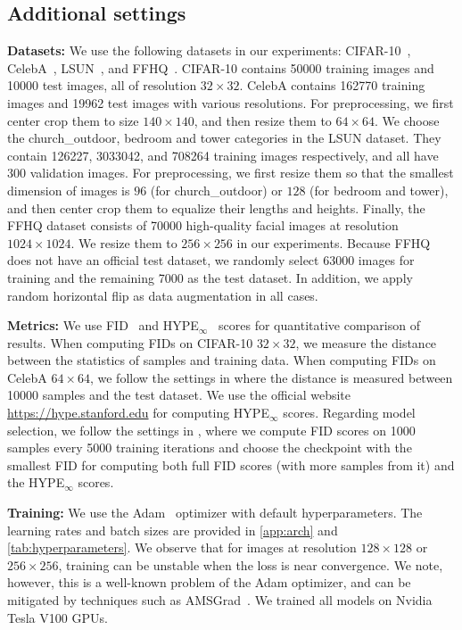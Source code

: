 \documentclass{article}
\begin{document}
\subsection{Additional settings}\label{app:settings}
\textbf{Datasets:} We use the following datasets in our experiments: CIFAR-10~\cite{krizhevsky2009learning}, CelebA~\cite{liu2015faceattributes}, LSUN~\cite{yu2015lsun}, and FFHQ~\cite{karras2019style}. CIFAR-10 contains 50000 training images and 10000 test images, all of resolution $32\times 32$. CelebA contains 162770 training images and 19962 test images with various resolutions. For preprocessing, we first center crop them to size $140\times 140$, and then resize them to $64\times 64$. We choose the church\_outdoor, bedroom and tower categories in the LSUN dataset. They contain 126227, 3033042, and 708264 training images respectively, and all have 300 validation images. For preprocessing, we first resize them so that the smallest dimension of images is $96$ (for church\_outdoor) or $128$ (for bedroom and tower), and then center crop them to equalize their lengths and heights. Finally, the FFHQ dataset consists of 70000 high-quality facial images at resolution $1024\times 1024$. We resize them to $256\times 256$ in our experiments. Because FFHQ does not have an official test dataset, we randomly select 63000 images for training and the remaining 7000 as the test dataset. In addition, we apply random horizontal flip as data augmentation in all cases.

\textbf{Metrics:} We use FID~\cite{heusel2017gans} and HYPE$_\infty$~\cite{zhou2019hype} scores for quantitative comparison of results. When computing FIDs on CIFAR-10 $32\times 32$, we measure the distance between the statistics of samples and training data. When computing FIDs on CelebA $64\times 64$, we follow the settings in \cite{song2019bridging} where the distance is measured between 10000 samples and the test dataset. We use the official website \href{https://hype.stanford.edu}{https://hype.stanford.edu} for computing HYPE$_\infty$ scores. Regarding model selection, we follow the settings in \cite{song2019generative}, where we compute FID scores on 1000 samples every 5000 training iterations and choose the checkpoint with the smallest FID for computing both full FID scores (with more samples from it) and the HYPE$_\infty$ scores.

\textbf{Training:} We use the Adam~\cite{kingma2014adam} optimizer with default hyperparameters. The learning rates and batch sizes are provided in \cref{app:arch} and \cref{tab:hyperparameters}. We observe that for images at resolution $128\times 128$ or $256\times 256$, training can be unstable when the loss is near convergence. We note, however, this is a well-known problem of the Adam optimizer, and can be mitigated by techniques such as AMSGrad~\cite{reddi2019convergence}. We trained all models on Nvidia Tesla V100 GPUs.
\end{document}
